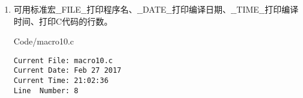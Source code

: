 \documentclass[10pt,a4paper%
tablecaptionabove]{article}
\def\tf{\ttfamily}
\begin{document}
\begin{CJK}{UTF8}{gkai}
\begin{enumerate}
\begin{lstlisting}[backgroundcolor=\color{red!10}]
\end{lstlisting}
\item 可用标准宏{\tf $\_\_$FILE$\_\_$}打印程序名、{\tf $\_\_$DATE$\_\_$}打印编译日期、{\tf$\_\_$TIME$\_\_$}打印编译时间、\tf{$\_\_$LINE$\_\_$}打印C代码的行数。

{Code/macro10.c}
\begin{lstlisting}[backgroundcolor=\color{red!10}]
Current File: macro10.c
Current Date: Feb 27 2017
Current Time: 21:02:36
Line  Number: 8 
\end{lstlisting}
\end{enumerate}

\end{CJK}
\end{document}

